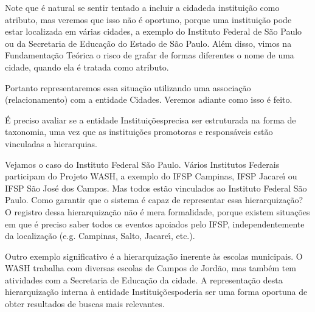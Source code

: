 \documentclass[
12pt,		%
openright,	%
twoside,  %
a4paper,			%
chapter=TITLE,		%
english,			%
french,				%
spanish,			%
brazil				%
]{USPSC-classe/USPSC}
\begin{document}
Note que \'e natural se sentir tentado a incluir a \textquotedbl cidade\textquotedbl  da institui\c{c}\~ao como atributo, mas veremos que isso n\~ao \'e oportuno, porque uma institui\c{c}\~ao pode estar localizada em v\'arias cidades, a exemplo do Instituto Federal de S\~ao Paulo ou da Secretaria de Educa\c{c}\~ao do Estado de S\~ao Paulo. Al\'em disso, vimos na Fundamenta\c{c}\~ao Te\'orica o risco de grafar de formas diferentes o nome de uma cidade, quando ela \'e tratada como atributo.










Portanto representaremos essa situa\c{c}\~ao utilizando uma associa\c{c}\~ao (relacionamento) com a entidade \textquotedbl Cidades\textquotedbl . Veremos adiante como isso \'e feito.










\'E preciso avaliar se a entidade \textquotedbl Institui\c{c}\~oes\textquotedbl  precisa ser estruturada na forma de taxonomia, uma vez que as institui\c{c}\~oes promotoras e respons\'aveis est\~ao vinculadas a hierarquias.










Vejamos o caso do Instituto Federal S\~ao Paulo. V\'arios Institutos Federais participam do Projeto WASH, a exemplo do IFSP Campinas, IFSP Jacare\'{\i} ou IFSP S\~ao Jos\'e dos Campos. Mas todos est\~ao vinculados ao Instituto Federal S\~ao Paulo. Como garantir que o sistema \'e capaz de representar essa hierarquiza\c{c}\~ao? O registro dessa hierarquiza\c{c}\~ao n\~ao \'e mera formalidade, porque existem situa\c{c}\~oes em que \'e preciso saber todos os eventos apoiados pelo IFSP, independentemente da localiza\c{c}\~ao (e.g. Campinas, Salto, Jacare\'{\i}, etc.).










Outro exemplo significativo \'e a hierarquiza\c{c}\~ao inerente \`as escolas municipais. O WASH trabalha com diversas escolas de Campos de Jord\~ao, mas tamb\'em tem atividades com a Secretaria de Educa\c{c}\~ao da cidade. A representa\c{c}\~ao desta hierarquiza\c{c}\~ao interna \`a entidade \textquotedbl Institui\c{c}\~oes\textquotedbl  poderia ser uma forma oportuna de obter resultados de buscas mais relevantes.
\end{document}
